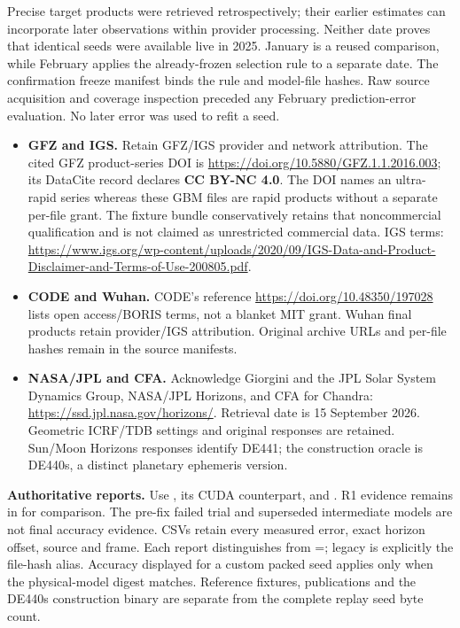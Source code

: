 Precise target products were retrieved retrospectively; their earlier estimates
can incorporate later observations within provider processing. Neither date
proves that identical seeds were available live in 2025. January is a reused
comparison, while February applies the already-frozen selection rule to a
separate date. The confirmation freeze manifest binds the rule and model-file
hashes. Raw source acquisition and coverage inspection preceded any February
prediction-error evaluation. No later error was used to refit a seed.

\begin{itemize}
\item \textbf{GFZ and IGS.} Retain GFZ/IGS provider and network attribution.
The cited GFZ product-series DOI is
\url{https://doi.org/10.5880/GFZ.1.1.2016.003}; its DataCite record declares
\textbf{CC BY-NC 4.0}. The DOI names an ultra-rapid series whereas these GBM
files are rapid products without a separate per-file grant. The fixture bundle
conservatively retains that noncommercial qualification and is not claimed as
unrestricted commercial data. IGS terms:
\url{https://www.igs.org/wp-content/uploads/2020/09/IGS-Data-and-Product-Disclaimer-and-Terms-of-Use-200805.pdf}.
\item \begin{minipage}[t]{\linewidth}\textbf{CODE and Wuhan.} CODE's reference
\url{https://doi.org/10.48350/197028} lists open access/BORIS terms, not a blanket
MIT grant. Wuhan final products retain provider/IGS attribution. Original
archive URLs and per-file hashes remain in the source manifests.\end{minipage}
\item \textbf{NASA/JPL and CFA.} Acknowledge Giorgini and the JPL Solar System
Dynamics Group, NASA/JPL Horizons, and CFA for Chandra:
\url{https://ssd.jpl.nasa.gov/horizons/}.
Retrieval date is 15 September 2026. Geometric ICRF/TDB settings and original
responses are retained. Sun/Moon Horizons responses identify DE441; the
construction oracle is DE440s, a distinct planetary ephemeris version.
\end{itemize}

\textbf{Authoritative reports.} Use
, its CUDA
counterpart, and
.
R1 evidence remains in  for comparison.
The pre-fix failed trial and superseded intermediate models are not final
accuracy evidence. CSVs retain every measured error, exact horizon offset,
source and frame. Each report distinguishes  from
=; legacy
 is explicitly the file-hash alias. Accuracy displayed for a
custom packed seed applies only when the physical-model digest matches.
Reference fixtures, publications and the DE440s construction binary are
separate from the complete replay seed byte count.

